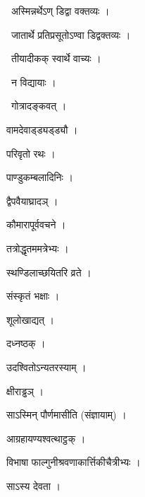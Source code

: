 \documentclass[10pt, openany, oneside]{book}
\begin{document}
\par\noindent\hspace{1.5em}{\vps वा॰}~{\qt अस्मिन्नर्थेऽण् डिद्वा वक्तव्यः ।}

\par\noindent\hspace{1.5em}{\vps वा॰}~{\qt जातार्थे प्रतिप्रसूतोऽण्वा डिद्वक्तव्यः ।}

\par\noindent\hspace{1.5em}{\vps वा॰}~{\qt तीयादीकक् स्वार्थे वाच्यः ।}

\par\noindent\hspace{1.5em}{\vps वा॰}~{\qt न विद्यायाः ।}

\par\noindent\hspace{1.5em}{\vps वा॰}~{\qt गोत्रादङ्कवत् ।}

\noindent वामदेवाड्ड्यड्ड्यौ ।

\noindent परिवृतो रथः ।

\noindent पाण्डुकम्बलादिनिः ।

\noindent द्वैपवैयाघ्रादञ् ।

\noindent कौमारापूर्ववचने ।

\noindent तत्रोद्धृतममत्रेभ्यः ।

\noindent स्थण्डिलाच्छयितरि व्रते ।

\noindent संस्कृतं भक्षाः ।

\noindent शूलोखाद्यत् ।

\noindent दध्नष्ठक् ।

\noindent उदश्वितोऽन्यतरस्याम् ।

\noindent क्षीराड्ढञ् ।

\noindent साऽस्मिन् पौर्णमासीति (संज्ञायाम्) ।

\noindent आग्रहायण्यश्वत्थाट्ठक् ।

\noindent विभाषा फाल्गुनीश्रवणाकार्त्तिकीचैत्रीभ्यः ।

\noindent साऽस्य देवता ।
\end{document}
